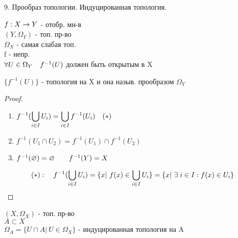 \documentclass[11pt, fleqn]{article}
\begin{document}
    \begin{question}{9. Прообраз топологии. Индуцированная топология.}
        \begin{definition} 
            $f: X \rightarrow Y$ - отобр. мн-в\\
            $(Y, \Omega_Y)$ - топ. пр-во\\
            $\Omega_X$ - самая слабая топ.\\
            f - непр.\\
            $\forall U \in \Omega_Y \quad f^{-1}(U)$ должен быть открытым в X
        \end{definition}
        \begin{theorem} 
            $\{f^{-1}(U)\}$ - топология на X и она назыв. прообразом $\Omega_Y$
        \end{theorem}

        \begin{proof} 
            \begin{enumerate}
                \item $\displaystyle f^{-1}(\bigcup_{i \in I} U_i) = \bigcup_{i \in I} f^{-1}(U_i) \quad (*)$
                \item $f^{-1}(U_1 \cap U_2) = f^{-1}(U_1) \cap f^{-1}(U_2)$
                \item $f^{-1}(\varnothing) = \varnothing \quad\quad f^{-1}(Y) = X$
            \end{enumerate}
            \[(*): \quad f^{-1}(\bigcup_{i \in I} U_i) = \{x | \ f(x) \in \bigcup_{i \in I} U_i\} = 
            \{x | \ \exists \; i \in I: f(x) \in U_i\}\]
        \end{proof}

        \begin{definition} 
            $(X, \Omega_X)$ - топ. пр-во\\
            $A \subset X$\\
            $\Omega_A = \{U \cap A | \ U \in \Omega_X\}$ - индуцированная топология на A
        \end{definition}
    \end{question}
\end{document}
